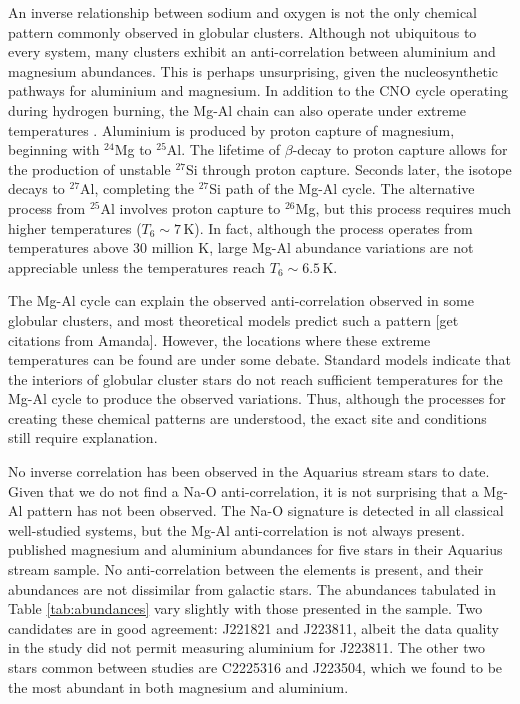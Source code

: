\documentclass{emulateapj}
\begin{document}
An inverse relationship between sodium and oxygen is not the only chemical pattern commonly observed in globular clusters. Although not ubiquitous to every system, many clusters exhibit an anti-correlation between aluminium and magnesium abundances. This is perhaps unsurprising, given the nucleosynthetic pathways for aluminium and magnesium. In addition to the CNO cycle operating during hydrogen burning, the Mg-Al chain can also operate under extreme temperatures \citep[$T_6 \sim 3$\,K][]{arnould;et-al_1999}. Aluminium is produced by proton capture of magnesium, beginning with $^{24}$Mg to $^{25}$Al. The lifetime of $\beta$-decay to proton capture allows for the production of unstable $^{27}$Si through proton capture. Seconds later, the isotope decays to $^{27}$Al, completing the $^{27}$Si path of the Mg-Al cycle. The alternative process from $^{25}$Al involves proton capture to $^{26}$Mg, but this process requires much higher temperatures ($T_6 \sim 7$\,K). In fact, although the process operates from temperatures above 30 million K, large Mg-Al abundance variations are not appreciable unless the temperatures reach $T_6 \sim 6.5$\,K. 

The Mg-Al cycle can explain the observed anti-correlation observed in some globular clusters, and most theoretical models predict such a pattern [get citations from Amanda]. However, the locations where these extreme temperatures can be found are under some debate. Standard models indicate that the interiors of globular cluster stars do not reach sufficient temperatures for the Mg-Al cycle to produce the observed variations. Thus, although the processes for creating these chemical patterns are understood, the exact site and conditions still require explanation.

No inverse correlation has been observed in the Aquarius stream stars to date. Given that we do not find a Na-O anti-correlation, it is not surprising that a Mg-Al pattern has not been observed. The Na-O signature is detected in all classical well-studied systems, but the Mg-Al anti-correlation is not always present. \citet{wylie-de-boer;et-al_2012} published magnesium and aluminium abundances for five stars in their Aquarius stream sample. No anti-correlation between the elements is present, and their abundances are not dissimilar from galactic stars. The abundances tabulated in Table \ref{tab:abundances} vary slightly with those presented in the \citet{wylie-de-boer;et-al_2012} sample. Two candidates are in good agreement: J221821 and J223811, albeit the data quality in the \citet{wylie-de-boer;et-al_2012} study did not permit measuring aluminium for J223811. The other two stars common between studies are C2225316 and J223504, which we found to be the most abundant in both magnesium and aluminium. 
\end{document}
